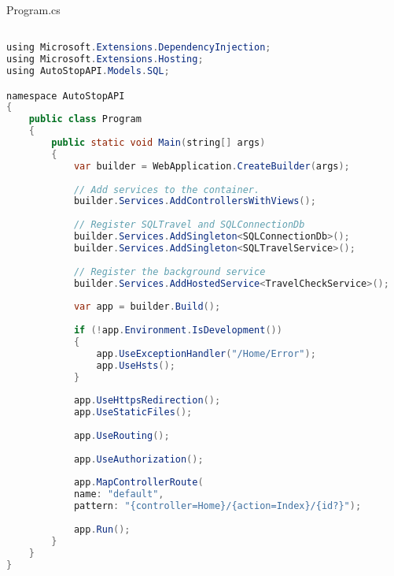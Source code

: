 
Program.cs
\begin{lstlisting}[language=Java]

using Microsoft.Extensions.DependencyInjection;
using Microsoft.Extensions.Hosting;
using AutoStopAPI.Models.SQL;

namespace AutoStopAPI
{
	public class Program
	{
		public static void Main(string[] args)
		{
			var builder = WebApplication.CreateBuilder(args);
			
			// Add services to the container.
			builder.Services.AddControllersWithViews();
			
			// Register SQLTravel and SQLConnectionDb
			builder.Services.AddSingleton<SQLConnectionDb>();
			builder.Services.AddSingleton<SQLTravelService>();
			
			// Register the background service
			builder.Services.AddHostedService<TravelCheckService>();
			
			var app = builder.Build();
			
			if (!app.Environment.IsDevelopment())
			{
				app.UseExceptionHandler("/Home/Error");
				app.UseHsts();
			}
			
			app.UseHttpsRedirection();
			app.UseStaticFiles();
			
			app.UseRouting();
			
			app.UseAuthorization();
			
			app.MapControllerRoute(
			name: "default",
			pattern: "{controller=Home}/{action=Index}/{id?}");
			
			app.Run();
		}
	}
}


\end{lstlisting}

